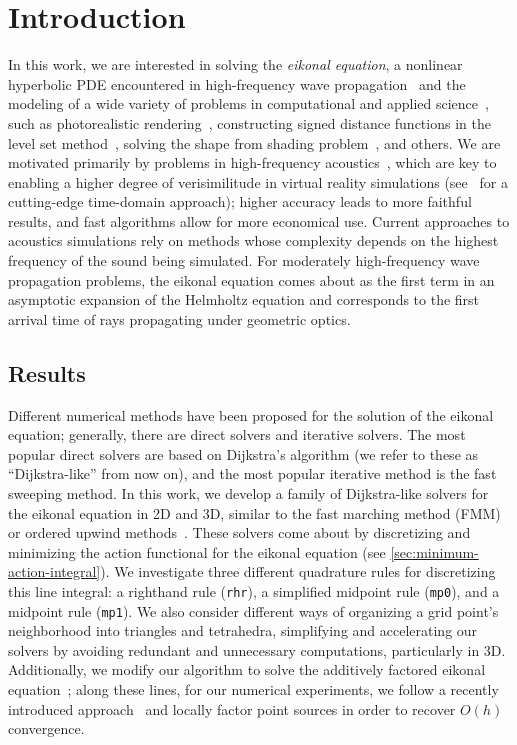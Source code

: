 \documentclass[eikonal.tex]{subfiles}
\begin{document}
\section{Introduction}\label{sec:introduction}

In this work, we are interested in solving the \emph{eikonal
  equation}, a nonlinear hyperbolic PDE encountered in high-frequency
wave propagation~\cite{engquist2003computational} and the modeling of
a wide variety of problems in computational and applied
science~\cite{sethian1999level}, such as photorealistic
rendering~\cite{ihrke2007eikonal}, constructing signed distance
functions in the level set method~\cite{osher2006level}, solving the
shape from shading
problem~\cite{kimmel2001optimal,prados2006shape,durou2008numerical},
and others. We are motivated primarily by problems in high-frequency
acoustics~\cite{prislan2016ray}, which are key to enabling a higher
degree of verisimilitude in virtual reality simulations
(see~\cite{raghuvanshi2014parametric,raghuvanshi2018parametric} for a
cutting-edge time-domain approach); higher accuracy leads to more
faithful results, and fast algorithms allow for more economical
use. Current approaches to acoustics simulations rely on methods whose
complexity depends on the highest frequency of the sound being
simulated. For moderately high-frequency wave propagation problems,
the eikonal equation comes about as the first term in an asymptotic
expansion of the Helmholtz equation and corresponds to the first
arrival time of rays propagating under geometric optics.

\subsection{Results}

Different numerical methods have been proposed for the solution of the
eikonal equation; generally, there are direct solvers and iterative
solvers. The most popular direct solvers are based on Dijkstra's
algorithm (we refer to these as ``Dijkstra-like'' from now on), and
the most popular iterative method is the fast sweeping method. In this
work, we develop a family of Dijkstra-like solvers for the eikonal
equation in 2D and 3D, similar to the fast marching method (FMM) or
ordered upwind
methods~\cite{sethian1996fast,sethian2003ordered}. These solvers come
about by discretizing and minimizing the action functional for the
eikonal equation (see \cref{sec:minimum-action-integral}). We
investigate three different quadrature rules for discretizing this
line integral: a righthand rule (\texttt{rhr}), a simplified midpoint
rule (\texttt{mp0}), and a midpoint rule (\texttt{mp1}). We also
consider different ways of organizing a grid point's neighborhood into
triangles and tetrahedra, simplifying and accelerating our solvers by
avoiding redundant and unnecessary computations, particularly in
3D. Additionally, we modify our algorithm to solve the additively
factored eikonal equation~\cite{luo2012fast}; along these lines, for
our numerical experiments, we follow a recently introduced
approach~\cite{qi2018corner} and locally factor point sources in order
to recover $O(h)$ convergence.
\end{document}

